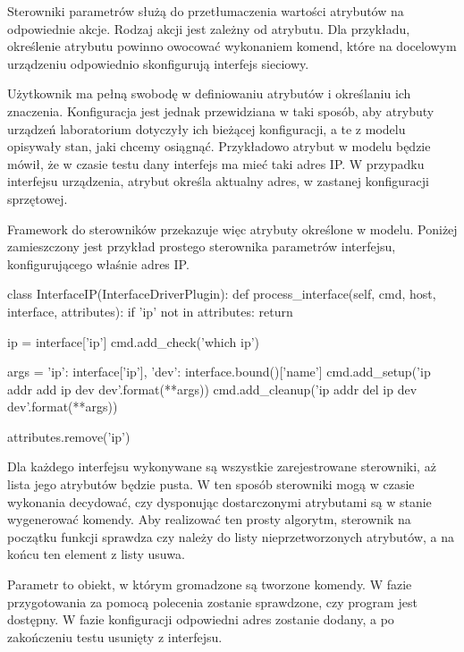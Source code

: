 \documentclass[00-praca-magisterska.tex]{subfiles}
\begin{document}
Sterowniki parametrów służą do przetłumaczenia wartości atrybutów na
odpowiednie akcje. Rodzaj akcji jest zależny od atrybutu.  Dla przykładu,
określenie atrybutu  powinno owocować wykonaniem komend, które na
docelowym urządzeniu odpowiednio skonfigurują interfejs sieciowy.

Użytkownik ma pełną swobodę w definiowaniu atrybutów i określaniu ich
znaczenia. Konfiguracja jest jednak przewidziana w taki sposób, aby atrybuty
urządzeń laboratorium dotyczyły ich bieżącej konfiguracji, a te z modelu
opisywały stan, jaki chcemy osiągnąć. Przykładowo atrybut  w modelu
będzie mówił, że w czasie testu dany interfejs ma mieć taki adres IP. W
przypadku interfejsu urządzenia, atrybut  określa aktualny adres, w
zastanej konfiguracji sprzętowej.

Framework do sterowników przekazuje więc atrybuty określone w modelu. Poniżej
zamieszczony jest przykład prostego sterownika parametrów interfejsu,
konfigurującego właśnie adres IP.

\begin{pythoncode}
  class InterfaceIP(InterfaceDriverPlugin):
      def process_interface(self, cmd, host, interface, attributes):
          if 'ip' not in attributes:
              return
  
          ip = interface['ip']
          cmd.add_check('which ip')
  
          args = {'ip': interface['ip'],
                  'dev': interface.bound()['name']}
          cmd.add_setup('ip addr add {ip} dev {dev}'.format(**args))
          cmd.add_cleanup('ip addr del {ip} dev {dev}'.format(**args))
  
          attributes.remove('ip')

\end{pythoncode}

Dla każdego interfejsu wykonywane są wszystkie zarejestrowane sterowniki, aż
lista jego atrybutów będzie pusta. W ten sposób sterowniki mogą w czasie
wykonania decydować, czy dysponując dostarczonymi atrybutami są w stanie
wygenerować komendy. Aby realizować ten prosty algorytm, sterownik na początku
funkcji  sprawdza czy  należy do listy
nieprzetworzonych atrybutów, a na końcu ten element z listy usuwa.

Parametr  to obiekt, w którym gromadzone są tworzone komendy. W fazie
przygotowania za pomocą polecenia  zostanie sprawdzone, czy program
 jest dostępny. W fazie konfiguracji odpowiedni adres zostanie dodany,
a po zakończeniu testu usunięty z interfejsu.
\end{document}
